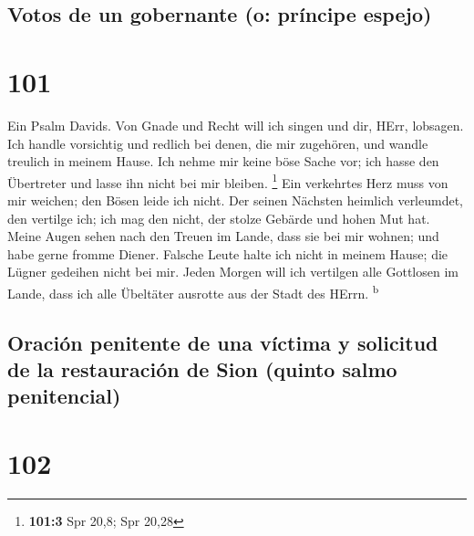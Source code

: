 \hypertarget{votos-de-un-gobernante-o-pruxedncipe-espejo}{%
\subsection{Votos de un gobernante (o: príncipe
espejo)}\label{votos-de-un-gobernante-o-pruxedncipe-espejo}}

\hypertarget{section-100}{%
\section{101}\label{section-100}}

 Ein Psalm Davids. Von Gnade und Recht will ich singen und
dir, HErr, lobsagen.  Ich handle vorsichtig und redlich
bei denen, die mir zugehören, und wandle treulich in meinem Hause.
 Ich nehme mir keine böse Sache vor; ich hasse den
Übertreter und lasse ihn nicht bei mir bleiben. \footnote{\textbf{101:3}
  Spr 20,8; Spr 20,28}  Ein verkehrtes Herz muss von mir
weichen; den Bösen leide ich nicht.  Der seinen Nächsten
heimlich verleumdet, den vertilge ich; ich mag den nicht, der stolze
Gebärde und hohen Mut hat.  Meine Augen sehen nach den
Treuen im Lande, dass sie bei mir wohnen; und habe gerne fromme Diener.
 Falsche Leute halte ich nicht in meinem Hause; die Lügner
gedeihen nicht bei mir.  Jeden Morgen will ich vertilgen
alle Gottlosen im Lande, dass ich alle Übeltäter ausrotte aus der Stadt
des HErrn. \textsuperscript{b}

\hypertarget{oraciuxf3n-penitente-de-una-vuxedctima-y-solicitud-de-la-restauraciuxf3n-de-sion-quinto-salmo-penitencial}{%
\subsection{Oración penitente de una víctima y solicitud de la
restauración de Sion (quinto salmo
penitencial)}\label{oraciuxf3n-penitente-de-una-vuxedctima-y-solicitud-de-la-restauraciuxf3n-de-sion-quinto-salmo-penitencial}}

\hypertarget{section-101}{%
\section{102}\label{section-101}}

